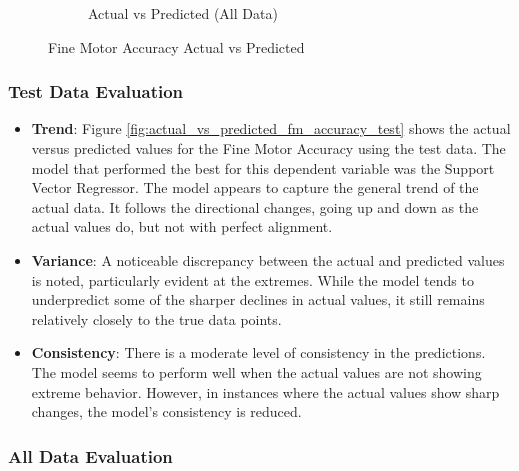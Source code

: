 \begin{figure}[htbp]
\begin{subfigure}[b]{0.49\textwidth}
        \caption{Actual vs Predicted (All Data)}
        \label{fig:actual_vs_predicted_fm_accuracy_all_data}
    \end{subfigure}
    \caption{Fine Motor Accuracy Actual vs Predicted}
    \label{fig:fine_motor_accuracy_comparison}
\end{figure}

\subsubsection*{Test Data Evaluation}

\begin{itemize}
    \item \textbf{Trend}: Figure \ref{fig:actual_vs_predicted_fm_accuracy_test} shows the actual versus predicted values for the Fine Motor Accuracy using the test data. The model
          that performed the best for this dependent variable was the Support Vector Regressor. The model appears to capture the general trend of the actual data. It follows the directional
          changes, going up and down as the actual values do, but not with perfect alignment.
    \item \textbf{Variance}: A noticeable discrepancy between the actual and predicted values is noted, particularly evident at the extremes. While the model tends to underpredict some of the sharper
          declines in actual values, it still remains relatively closely to the true data points.
    \item \textbf{Consistency}: There is a moderate level of consistency in the predictions. The model seems to perform well when the actual values are not showing extreme behavior. However,
          in instances where the actual values show sharp changes, the model's consistency is reduced.
\end{itemize}

\subsubsection*{All Data Evaluation}

